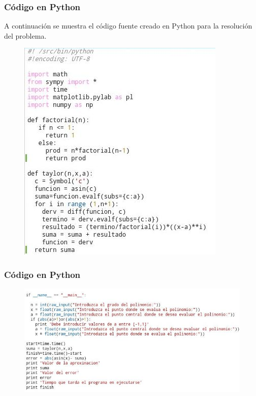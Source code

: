 \documentclass{beamer}
\begin{document}
\begin{frame}
\frametitle{Código en \textsf{Python}}
A continuación se muestra el código fuente creado en \textsf{Python} para la resolución del problema.

\begin{figure}[b]
\begin{center}
\includegraphics[scale=0.5]{py1.jpeg}
\end{center}
\end{figure}

\end{frame}



\begin{frame}
\frametitle{Código en \textsf{Python}}

\begin{figure}[b]
\begin{center}
\includegraphics[scale=0.6]{py2.jpeg}
\end{center}
\end{figure}

\end{frame}
\end{document}
